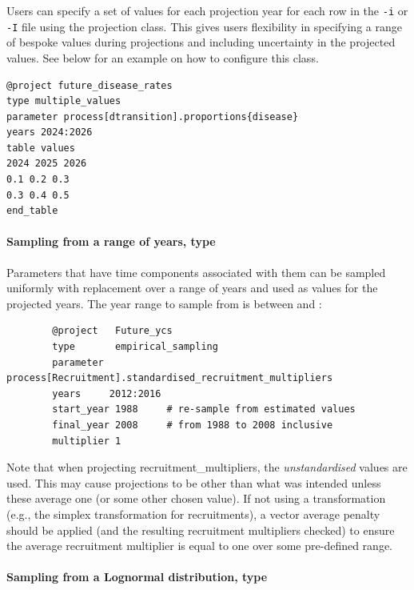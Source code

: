 Users can specify a set of values for each projection year for each row in the \texttt{-i} or \texttt{-I} file using the  projection class. This gives users flexibility in specifying a range of bespoke values during projections and including uncertainty in the projected values. See below for an example on how to configure this class.

{\small{\begin{verbatim}
@project future_disease_rates
type multiple_values
parameter process[dtransition].proportions{disease}  
years 2024:2026
table values
2024 2025 2026
0.1 0.2 0.3
0.3 0.4 0.5
end_table
\end{verbatim}}}

\paragraph[Empirical sampling]{Sampling from a range of years, type  }\label{sec:Project-EmpiricalSampling}

Parameters that have time components associated with them can be sampled uniformly with replacement over a range of years and used as values for the projected years. The year range to sample from is between  and :

{\small{\begin{verbatim}
		@project   Future_ycs
		type       empirical_sampling
		parameter  process[Recruitment].standardised_recruitment_multipliers
		years     2012:2016
		start_year 1988     # re-sample from estimated values
		final_year 2008     # from 1988 to 2008 inclusive
		multiplier 1
		\end{verbatim}}}

Note that when projecting recruitment\_multipliers, the \emph{unstandardised} values are used. This may cause projections to be other than what was intended unless these average one (or some other chosen value). If not using a transformation (e.g., the simplex transformation for recruitments), a vector average penalty should be applied (and the resulting recruitment multipliers checked) to ensure the average recruitment multiplier is equal to one over some pre-defined range. 

\paragraph[Lognormal]{Sampling from a Lognormal distribution, type  }\label{sec:Project-LogNormal} 

